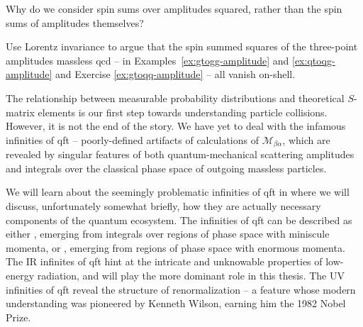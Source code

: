 \begin{exercise}
    Why do we consider spin sums over amplitudes squared, rather than the spin sums of amplitudes themselves?
\end{exercise}



\begin{exercise}
    \label{ex:squared-amplitudes}
    Use Lorentz invariance to argue that the spin summed squares of the three-point amplitudes massless \gls{qcd} -- in Examples~\ref{ex:gtogg-amplitude} and \ref{ex:qtoqg-amplitude} and Exercise \ref{ex:gtoqq-amplitude} -- all vanish on-shell.
\end{exercise}


The relationship between measurable probability distributions and theoretical \(S\)-matrix elements is our first step towards understanding particle collisions.
%
However, it is not the end of the story.
%
We have yet to deal with the infamous infinities of \gls{qft} -- poorly-defined artifacts of calculations of \(\mathcal{M}_{\beta\alpha}\), which are revealed by singular features of both quantum-mechanical scattering amplitudes and integrals over the classical phase space of outgoing massless particles.

We will learn about the seemingly problematic infinities of \gls{qft} in  where we will discuss, unfortunately somewhat briefly, how they are actually necessary components of the quantum ecosystem.
%
The infinities of \gls{qft} can be described as either , emerging from integrals over regions of phase space with miniscule momenta, or , emerging from regions of phase space with enormous momenta.
%
The IR infinites of \gls{qft} hint at the intricate and unknowable properties of low-energy radiation, and will play the more dominant role in this thesis.
%
The UV infinities of \gls{qft} reveal the structure of renormalization -- a feature whose modern understanding was pioneered by Kenneth Wilson, earning him the 1982 Nobel Prize.

